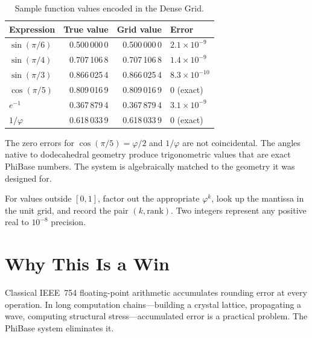 \documentclass[12pt]{article}
\theoremstyle{definition}
\theoremstyle{remark}
\begin{document}
\begin{table}[h]
\centering
\caption{Sample function values encoded in the Dense Grid.}
\label{tab:funclookup}
\begin{tabular}{lrrl}
\toprule
Expression & True value & Grid value & Error \\
\midrule
$\sin(\pi/6)$   & 0.500\,000\,0 & 0.500\,000\,0 & $2.1\times10^{-9}$ \\
$\sin(\pi/4)$   & 0.707\,106\,8 & 0.707\,106\,8 & $1.4\times10^{-9}$ \\
$\sin(\pi/3)$   & 0.866\,025\,4 & 0.866\,025\,4 & $8.3\times10^{-10}$ \\
$\cos(\pi/5)$   & 0.809\,016\,9 & 0.809\,016\,9 & $0$ (exact) \\
$e^{-1}$        & 0.367\,879\,4 & 0.367\,879\,4 & $3.1\times10^{-9}$ \\
$1/\varphi$     & 0.618\,033\,9 & 0.618\,033\,9 & $0$ (exact) \\
\bottomrule
\end{tabular}
\end{table}

The zero errors for $\cos(\pi/5) = \varphi/2$ and $1/\varphi$ are
not coincidental.  The angles native to dodecahedral geometry produce
trigonometric values that are exact PhiBase numbers.  The system is
algebraically matched to the geometry it was designed for.

For values outside $[0,1]$, factor out the appropriate $\varphi^k$,
look up the mantissa in the unit grid, and record the pair $(k,
\text{rank})$.  Two integers represent any positive real to $10^{-8}$
precision.

\section{Why This Is a Win}

Classical IEEE~754 floating-point arithmetic accumulates rounding error
at every operation.  In long computation chains---building a crystal
lattice, propagating a wave, computing structural stress---accumulated
error is a practical problem.  The PhiBase system eliminates it.
\end{document}
